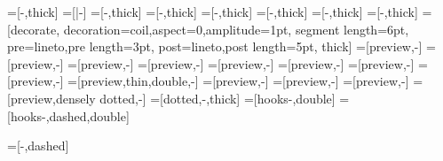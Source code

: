 \usetikzlibrary{decorations,decorations.pathmorphing,decorations.markings}
=[-\@mmtarrowtip,thick]
=[|-\@mmtarrowtip] %
=[-\@mmtarrowtip,thick]
=[\@mmtarrowtipmonoright-\@mmtarrowtip,thick]
=[\@mmtarrowtip-\@mmtarrowtipmonoright,thick]
=[\@mmtarrowtipmonoright-\@mmtarrowtippartial,thick]
=[\@mmtarrowtipmonoleft-\@mmtarrowtip,thick]
=[\@mmtarrowtipmonoleft-\@mmtarrowtippartialleft,thick]
=[decorate,
                                decoration={coil,aspect=0,amplitude=1pt,
                                                    segment length=6pt,
                                                    pre=lineto,pre length=3pt,
                                                    post=lineto,post length=5pt},
                                thick]
=[preview,-\@mmtarrowtip]
=[preview,\@mmtarrowtipmonoright-\@mmtarrowtip]
=[preview,-\@mmtarrowtippartial]
=[preview,\@mmtarrowtipmonoright-\@mmtarrowtippartial]
=[preview,-\@mmtarrowtip]
=[preview,\@mmtarrowtipmonoleft-\@mmtarrowtip]
=[preview,-\@mmtarrowtippartialleft]
=[preview,\@mmtarrowtipmonoleft-\@mmtarrowtippartialleft]
=[preview,thin,double,-\@mmtarrowtip]
=[preview,\@mmtarrowtip-\@mmtarrowtip]
=[preview,\@mmtreversearrowtippartial-\@mmtarrowtippartial]
=[preview,\@mmtreversearrowtippartialleft-\@mmtarrowtippartialleft]
=[preview,densely dotted,-\@mmtarrowtip]
=[dotted,-\@mmtarrowtip,thick]
=[hooks-\@mmtarrowtip,double]
=[hooks-\@mmtarrowtip,dashed,double]


=[\@mmtarrowtip-\@mmtarrowtip,dashed]

